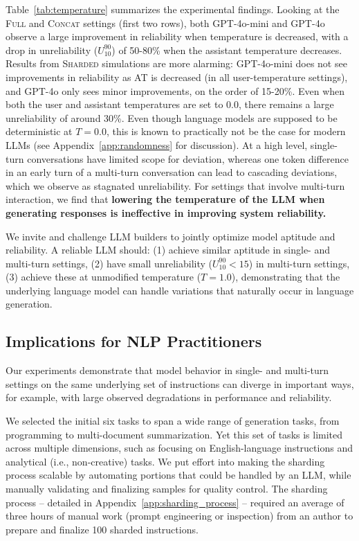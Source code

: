 \documentclass{article}
\newcommand{\fullt}{\textsc{Full}\xspace}
\newcommand{\concatt}{\textsc{Concat}\xspace}
\newcommand{\shardedt}{\textsc{Sharded}\xspace}
\begin{document}
Table~\ref{tab:temperature} summarizes the experimental findings. Looking at the \fullt and \concatt settings (first two rows), both GPT-4o-mini and GPT-4o observe a large improvement in reliability when temperature is decreased, with a drop in unreliability ($U_{10}^{90}$) of 50-80\% when the assistant temperature decreases. Results from \shardedt simulations are more alarming: GPT-4o-mini does not see improvements in reliability as AT is decreased (in all user-temperature settings), and GPT-4o only sees minor improvements, on the order of 15-20\%. Even when both the user and assistant temperatures are set to 0.0, there remains a large unreliability of around 30\%. Even though language models are supposed to be deterministic at $T=0.0$, this is known to practically not be the case for modern LLMs (see Appendix~\ref{app:randomness} for discussion).
At a high level, single-turn conversations have limited scope for deviation, whereas one token difference in an early turn of a multi-turn conversation can lead to cascading deviations, which we observe as stagnated unreliability.
For settings that involve multi-turn interaction, we find that \textbf{lowering the temperature of the LLM when generating responses is ineffective in improving system reliability.}

We invite and challenge LLM builders to jointly optimize model aptitude and reliability. A reliable LLM should: (1) achieve similar aptitude in single- and multi-turn settings, (2) have small unreliability ($U_{10}^{90} < 15$) in multi-turn settings, (3) achieve these at unmodified temperature ($T=1.0$), demonstrating that the underlying language model can handle variations that naturally occur in language generation.

\subsection{Implications for NLP Practitioners} \label{sec:implications_nlp}

Our experiments demonstrate that model behavior in single- and multi-turn settings on the same underlying set of instructions can diverge in important ways, for example, with large observed degradations in performance and reliability.

We selected the initial six tasks to span a wide range of generation tasks, from programming to multi-document summarization. Yet this set of tasks is limited across multiple dimensions, such as focusing on English-language instructions and analytical (i.e., non-creative) tasks. We put effort into making the sharding process scalable by automating portions that could be handled by an LLM, while manually validating and finalizing samples for quality control. The sharding process -- detailed in Appendix~\ref{app:sharding_process} -- required an average of three hours of manual work (prompt engineering or inspection) from an author to prepare and finalize 100 sharded instructions.
\end{document}
